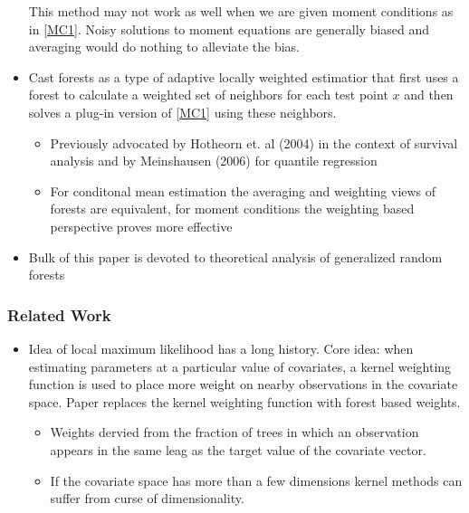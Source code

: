 \begin{itemize}
	This method may not work as well when we are given moment conditions as in \ref{MC1}. Noisy solutions to moment equations are generally biased and averaging would do nothing to alleviate the bias.

	\item Cast forests as a type of adaptive locally weighted estimatior that first uses a forest to calculate a weighted set of neighbors for each test point $x$ and then solves a plug-in version of \ref{MC1} using these neighbors.
	\begin{itemize}
		\item Previously advocated by Hotheorn et. al (2004) in the context of survival analysis and by Meinshausen (2006) for quantile regression
		\item For conditonal mean estimation the averaging and weighting views of forests are equivalent, for moment conditions the weighting based perspective proves more effective
	\end{itemize}
	\item Bulk of this paper is devoted to theoretical analysis of generalized random forests
\end{itemize}
\subsubsection{Related Work}
\begin{itemize}
	\item Idea of local maximum likelihood has a long history. Core idea: when estimating parameters at a particular value of covariates, a kernel weighting function is used to place more weight on nearby observations in the covariate space. Paper replaces the kernel weighting function with forest based weights. 
	\begin{itemize}
		\item Weights dervied from the fraction of trees in which an observation appears in the same leag as the target value of the covariate vector.
		\item If the covariate space has more than a few dimensions kernel methods can suffer from curse of dimensionality.
	\end{itemize}
\end{itemize}
